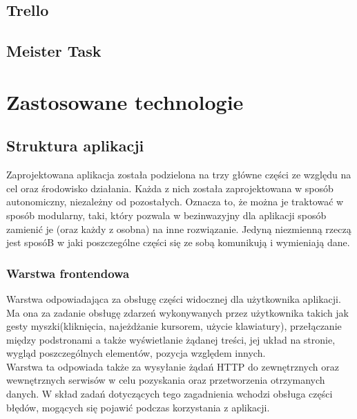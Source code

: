\documentclass[eng,printmode]{mgr}
\begin{document}
\subsection{Trello}

\subsection{Meister Task}

\section{Zastosowane technologie}
\subsection{Struktura aplikacji}
Zaprojektowana aplikacja została podzielona na trzy główne części ze względu na cel oraz środowisko działania. Każda z nich została zaprojektowana w sposób autonomiczny, niezależny od pozostałych. Oznacza to, że można je traktować w sposób modularny, taki, który pozwala w bezinwazyjny dla aplikacji sposób zamienić je (oraz każdy z osobna) na inne rozwiązanie. Jedyną niezmienną rzeczą jest sposóB w jaki poszczególne części się ze sobą komunikują i wymieniają dane. 
\subsubsection{Warstwa frontendowa}
Warstwa odpowiadająca za obsługę części widocznej dla użytkownika aplikacji. Ma ona za zadanie obsługę zdarzeń wykonywanych przez użytkownika takich jak gesty myszki(kliknięcia, najeżdżanie kursorem, użycie klawiatury), przełączanie między podstronami a także wyświetlanie żądanej treści, jej układ na stronie, wygląd poszczególnych elementów, pozycja względem innych.
\\
Warstwa ta odpowiada także za wysyłanie żądań HTTP do zewnętrznych oraz wewnętrznych serwisów w celu pozyskania oraz przetworzenia otrzymanych danych. W skład zadań dotyczących tego zagadnienia wchodzi obsługa części błędów, mogących się pojawić podczas korzystania z aplikacji.
\end{document}
